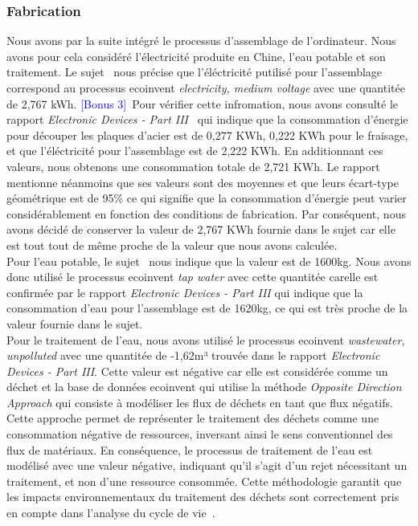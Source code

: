 \documentclass[12pt,a4paper]{paper}
\begin{document}
\subsubsection{Fabrication}
Nous avons par la suite intégré le processus d'assemblage de l'ordinateur. Nous avons pour cela considéré l'électricité produite en Chine, l'eau potable et son traitement.
Le sujet~\cite{TP2_ACV_ENSEIRB-MATMECA} nous précise que l'éléctricité putilisé pour l'assemblage correspond au processus ecoinvent \textit{electricity,
medium voltage} avec une quantitée de 2,767 kWh. \textcolor{blue}{[Bonus 3]}~Pour vérifier cette infromation, nous avons consulté le rapport \textit{Electronic Devices - Part III}~\cite{Lehmann2007} qui indique que la consommation d'énergie pour découper les plaques d'acier est de 0,277 KWh, 0,222 KWh pour le fraisage, et que l'éléctricité pour l'assemblage est de 2,222 KWh. En additionnant ces valeurs, nous obtenons une consommation totale de 2,721 KWh. Le rapport mentionne néanmoins que ses valeurs sont des moyennes et que leurs écart-type géométrique est de 95\% ce qui signifie que la consommation d'énergie peut varier considérablement en fonction des conditions de fabrication. Par conséquent, nous avons décidé de conserver la valeur de 2,767 KWh fournie dans le sujet car elle est tout tout de même proche de la valeur que nous avons calculée.\\
Pour l'eau potable, le sujet~\cite{TP2_ACV_ENSEIRB-MATMECA} nous indique que la valeur est de 1600kg. Nous avons donc utilisé le processus ecoinvent \textit{tap water} avec cette quantitée carelle est confirmée par le rapport \textit{Electronic Devices - Part III}\cite{Lehmann2007} qui indique que la consommation d'eau pour l'assemblage est de 1620kg, ce qui est très proche de la valeur fournie dans le sujet.\\
Pour le traitement de l'eau, nous avons utilisé le processus ecoinvent \textit{wastewater, unpolluted} avec une quantitée de -1,62m³ trouvée dans le rapport \textit{Electronic Devices - Part III}\cite{Lehmann2007}. Cette valeur est négative car elle est considérée comme un déchet et la base de données ecoinvent qui utilise la méthode \textit{Opposite Direction Approach} qui consiste à modéliser les flux de déchets en tant que flux négatifs. Cette approche permet de représenter le traitement des déchets comme une consommation négative de ressources, inversant ainsi le sens conventionnel des flux de matériaux. En conséquence, le processus de traitement de l’eau est modélisé avec une valeur négative, indiquant qu’il s’agit d’un rejet nécessitant un traitement, et non d’une ressource consommée. Cette méthodologie garantit que les impacts environnementaux du traitement des déchets sont correctement pris en compte dans l’analyse du cycle de vie~\cite{openLCATutorial2020}.
\end{document}
